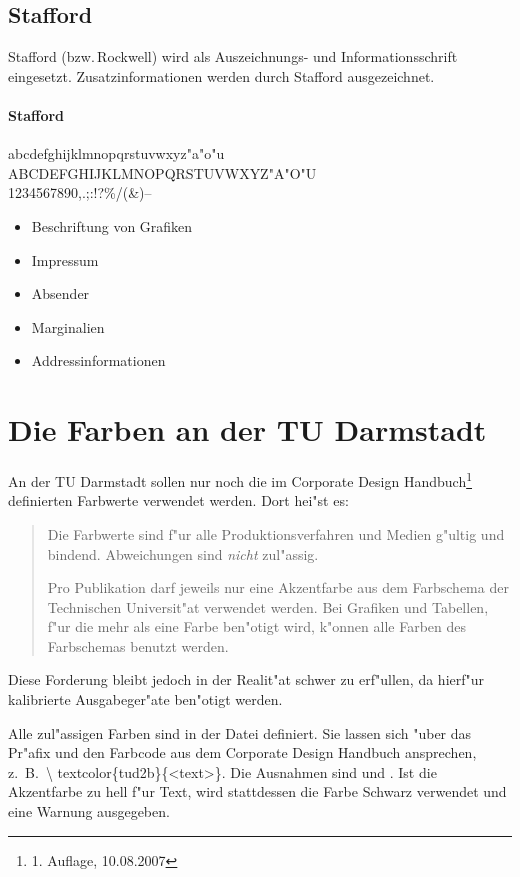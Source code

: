 \documentclass[twoside,colorback,accentcolor=tud4c,11pt]{tudreport}
\begin{document}
  \subsection{Stafford}
    Stafford (bzw.\,Rockwell) wird als Auszeichnungs- und Informationsschrift eingesetzt.
    Zusatzinformationen werden durch Stafford ausgezeichnet.
    \paragraph{Stafford}
      \hfill%
      \begin{minipage}{\textwidth-\the\parindent}
        \accentfont
        \noindent
        abcdefghijklmnopqrstuvwxyz"a"o"u\\
        ABCDEFGHIJKLMNOPQRSTUVWXYZ"A"O"U\\
        1234567890,.;:!?\glqq\grqq@ \texteuro\%/(\&)--
      \end{minipage}
      \begin{itemize}
        \item Beschriftung von Grafiken
        \item Impressum
        \item Absender
        \item Marginalien
        \item Addressinformationen
      \end{itemize}
  
  \section{Die Farben an der TU Darmstadt}
    
    An der TU Darmstadt sollen nur noch die im Corporate Design Handbuch\footnote{1.
    Auflage, 10.08.2007} definierten Farbwerte verwendet werden. Dort hei"st es:
    \begin{quote}
     Die Farbwerte sind f"ur alle Produktionsverfahren und Medien g"ultig
     und bindend. Abweichungen sind \emph{nicht} zul"assig.

     Pro Publikation darf jeweils nur eine Akzentfarbe aus dem Farbschema
     der Technischen Universit"at verwendet werden. Bei Grafiken und Tabellen,
     f"ur die mehr als eine Farbe ben"otigt wird, k"onnen alle Farben des
     Farbschemas benutzt werden.
    \end{quote}
  Diese Forderung bleibt jedoch in der Realit"at schwer zu erf"ullen, da
  hierf"ur kalibrierte Ausgabeger"ate ben"otigt werden.

  Alle zul"assigen Farben sind in der Datei 
  definiert. Sie lassen sich "uber das Pr"afix  und den Farbcode
  aus dem Corporate Design Handbuch ansprechen, z.\ B.\ \textcolor{tud2a}{\textbackslash
  textcolor\{tud2b\}\{<text>\}}. Die Ausnahmen sind  und .
  Ist die Akzentfarbe zu hell f"ur Text, wird stattdessen die Farbe Schwarz verwendet und
  eine Warnung ausgegeben.
  
\end{document}
